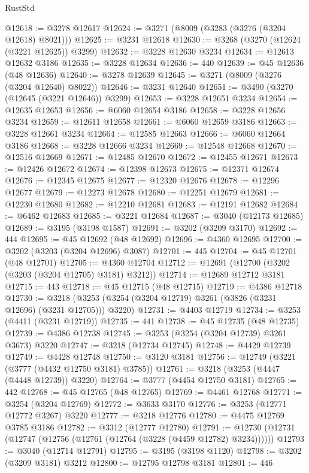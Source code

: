 \begin{lexlean}{RustStd}
\begin{coremodule}
@12618 := @3278 @12617
@12624 := @3271 (@8009 (@3283 (@3276 (@3204 @12618) @8021)))
@12625 := @3231 @12618
@12630 := @3268 (@3270 (@12624 (@3221 @12625)) @3299)
@12632 := @3228 @12630 @3234
@12634 := @12613 @12632 @3186
@12635 := @3228 @12634
@12636 := 440
@12639 := @45 @12636 (@48 @12636)
@12640 := @3278 @12639
@12645 := @3271 (@8009 (@3276 (@3204 @12640) @8022))
@12646 := @3231 @12640
@12651 := @3490 (@3270 (@12645 (@3221 @12646)) @3299)
@12653 := @3228 @12651 @3234
@12654 := @12635 @12653
@12656 := @6060 @12654 @3186
@12658 := @3228 @12656 @3234
@12659 := @12611 @12658
@12661 := @6060 @12659 @3186
@12663 := @3228 @12661 @3234
@12664 := @12585 @12663
@12666 := @6060 @12664 @3186
@12668 := @3228 @12666 @3234
@12669 := @12548 @12668
@12670 := @12516 @12669
@12671 := @12485 @12670
@12672 := @12455 @12671
@12673 := @12426 @12672
@12674 := @12398 @12673
@12675 := @12371 @12674
@12676 := @12345 @12675
@12677 := @12320 @12676
@12678 := @12296 @12677
@12679 := @12273 @12678
@12680 := @12251 @12679
@12681 := @12230 @12680
@12682 := @12210 @12681
@12683 := @12191 @12682
@12684 := @6462 @12683
@12685 := @3221 @12684
@12687 := @3040 (@12173 @12685)
@12689 := @3195 (@3198 @1587)
@12691 := @3202 (@3209 @3170)
@12692 := 444
@12695 := @45 @12692 (@48 @12692)
@12696 := @4360 @12695
@12700 := @3202 (@3203 (@3204 @12696) @3087)
@12701 := 445
@12704 := @45 @12701 (@48 @12701)
@12705 := @4360 @12704
@12712 := @12691 (@12700 (@3202 (@3203 (@3204 @12705) @3181) @3212))
@12714 := @12689 @12712 @3181
@12715 := 443
@12718 := @45 @12715 (@48 @12715)
@12719 := @4386 @12718
@12730 := @3218 (@3253 (@3254 (@3204 @12719) @3261 (@3826 (@3231 @12696) (@3231 @12705))) @3220)
@12731 := @4403 @12719
@12734 := @3253 (@4411 (@3231 @12719))
@12735 := 441
@12738 := @45 @12735 (@48 @12735)
@12739 := @4386 @12738
@12745 := @3253 (@3254 (@3204 @12739) @3261 @3673) @3220
@12747 := @3218 (@12734 @12745)
@12748 := @4429 @12739
@12749 := @4428 @12748
@12750 := @3120 @3181
@12756 := @12749 (@3221 (@3777 (@4432 @12750 @3181) @3785))
@12761 := @3218 (@3253 (@4447 (@4448 @12739)) @3220)
@12764 := @3777 (@4454 @12750 @3181)
@12765 := 442
@12768 := @45 @12765 (@48 @12765)
@12769 := @4461 @12768
@12771 := @3254 (@3204 @12769)
@12772 := @3633 @3170
@12776 := @3253 (@12771 @12772 @3267) @3220
@12777 := @3218 @12776
@12780 := @4475 @12769 @3785 @3186
@12782 := @3312 (@12777 @12780)
@12791 := @12730 (@12731 (@12747 (@12756 (@12761 (@12764 (@3228 (@4459 @12782) @3234))))))
@12793 := @3040 (@12714 @12791)
@12795 := @3195 (@3198 @1120)
@12798 := @3202 (@3209 @3181) @3212
@12800 := @12795 @12798 @3181
@12801 := 446

\end{coremodule}
\end{lexlean}
